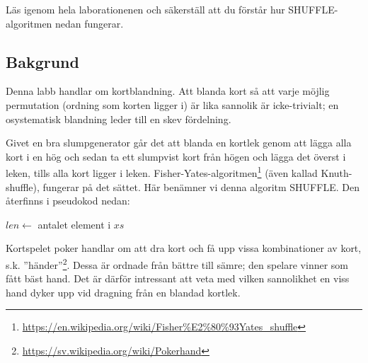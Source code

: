 

\Lab{\LabWeekSIX}

\begin{Goals}

\end{Goals}

\begin{Preparations}
\item {}
\item Läs igenom hela laborationenen och säkerställ att du förstår hur SHUFFLE-algoritmen nedan fungerar.
\end{Preparations}

\subsection{Bakgrund}

Denna labb handlar om kortblandning. Att blanda kort så att varje möjlig permutation (ordning som korten ligger i) är lika sannolik är icke-trivialt; en osystematisk blandning leder till en skev fördelning.

Givet en bra slumpgenerator går det att blanda en kortlek genom att lägga alla kort i en hög och sedan ta ett slumpvist kort från högen och lägga det överst i leken, tills alla kort ligger i leken. Fisher-Yates-algoritmen\footnote{\href{https://en.wikipedia.org/wiki/Fisher\%E2\%80\%93Yates_shuffle}{https://en.wikipedia.org/wiki/Fisher\%E2\%80\%93Yates\_shuffle}} (även kallad Knuth-shuffle), fungerar på det sättet. Här benämner vi denna algoritm SHUFFLE. Den återfinns i pseudokod nedan:

\begin{algorithm}[H]
 $len \leftarrow$ antalet element i $xs$ \\
\end{algorithm}

Kortspelet poker handlar om att dra kort och få upp vissa kombinationer av kort, s.k. ''händer''\footnote{\href{https://sv.wikipedia.org/wiki/Pokerhand}{https://sv.wikipedia.org/wiki/Pokerhand}}. Dessa är ordnade från bättre till sämre; den spelare vinner som fått bäst hand.
Det är därför intressant att veta med vilken sannolikhet en viss hand dyker upp vid dragning från en blandad kortlek.

